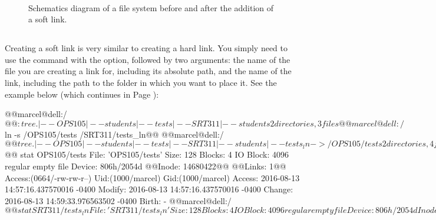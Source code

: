 \begin{figure}[!htbp]
\centering
   \hspace*{-2cm}
        \\
   \hspace*{-2cm}
        \caption[]{Schematics diagram of a file system before and after the addition of a soft link.\label{fig:ch7_soft_link}}
\end{figure}

\subsection{}


Creating a soft link is very similar to creating a hard link. You simply need to use the  command with the  option, followed by two arguments: the name of the file you are creating a link for, including its absolute path, and the name of the link, including the path to the folder in which you want to place it. See the example below (which continues in Page \pageref{src:ch7_ex2}):

\begin{source_code}[Bash]
@@marcel@dell:/$@@: tree
.
|-- OPS105
    |-- students
    |-- tests
|-- SRT311
    |-- students
2 directories, 3 files
@@marcel@dell:/$ln -s /OPS105/tests /SRT311/tests_ln@@
@@marcel@dell:/$@@tree
.
|-- OPS105
    |-- students
    |-- tests
|-- SRT311
    |-- students
    |-- tests_ln -> /OPS105/tests
2 directories, 4 files
@@marcel@dell:/$@@ stat OPS105/tests
  File: 'OPS105/tests'
  Size: 128         	Blocks: 4          IO Block: 4096   regular empty file
Device: 806h/2054d	@@Inode: 14680422@@    @@Links: 1@@
Access:(0664/-rw-rw-r--) Uid:(1000/marcel) Gid:(1000/marcel)
Access: 2016-08-13 14:57:16.437570016 -0400
Modify: 2016-08-13 14:57:16.437570016 -0400
Change: 2016-08-13 14:59:33.976563502 -0400
 Birth: -
@@marcel@dell:/$@@ stat SRT311/tests_ln
  File: 'SRT311/tests_ln'
  Size: 128         	Blocks: 4          IO Block: 4096   regular empty file
Device: 806h/2054d	Inode: @@14680425@@    @@Links: 1@@
Access:(0664/-rw-rw-r--) Uid:(1000/marcel) Gid:(1000/marcel)
Access: 2016-08-13 14:57:16.437570016 -0400
Modify: 2016-08-13 14:57:16.437570016 -0400
Change: 2016-08-13 14:59:33.976563502 -0400
 Birth: -
@@marcel@dell:/$
\end{source_code}
\label{src:ch7_ex2}

